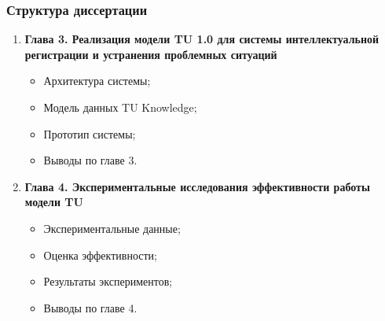 \documentclass[14pt]{beamer}
\begin{document}
\begin{frame}
\frametitle{Структура диссертации}
\begin{enumerate}
  \item \textbf{Глава 3. Реализация модели TU 1.0 для системы интеллектуальной регистрации и устранения проблемных ситуаций}
  \begin{itemize}
    \item Архитектура системы;
    \item Модель данных TU Knowledge;
    \item Прототип системы;
    \item Выводы по главе 3.
  \end{itemize}
   \item \textbf{Глава 4. Экспериментальные исследования эффективности работы модели TU}
  \begin{itemize}
    \item Экспериментальные данные;
    \item Оценка эффективности;
    \item Результаты экспериментов;
    \item Выводы по главе 4.
  \end{itemize}

\end{enumerate}
\end{frame}

\end{document}
